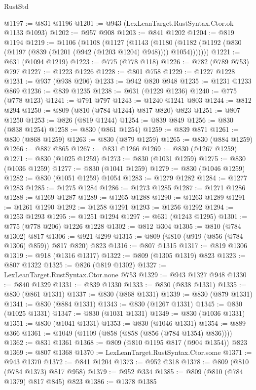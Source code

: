 \begin{lexlean}{RustStd}
\begin{coremodule}
@1197 := @831 @1196
@1201 := @943 (LexLeanTarget.RustSyntax.Ctor.ok @1133 @1093)
@1202 := @957 @908
@1203 := @841 @1202
@1204 := @819 @1194
@1219 := @1106
    (@1108
      (@1127
        (@1143
          (@1180 (@1182 (@1192 (@830 (@1197 (@839 (@1201 (@942 (@1203 @1204) @948)))) @1054)))))))
@1221 := @631 (@1094 @1219)
@1223 := @775 (@778 @118)
@1226 := @782 (@789 @753) @797
@1227 := @1223 @1226
@1228 := @801 @758
@1229 := @1227 @1228
@1231 := @937 (@938 @206)
@1233 := @942 @820 @948
@1235 := @1231 @1233 @869
@1236 := @839 @1235
@1238 := @631 (@1229 @1236)
@1240 := @775 (@778 @123)
@1241 := @791 @797
@1243 := @1240 @1241 @803
@1244 := @812 @294
@1250 := @809 (@810 (@784 @1244) @817 @820) @823
@1251 := @807 @1250
@1253 := @826 (@819 @1244)
@1254 := @839 @849
@1256 := @830 (@838 @1254)
@1258 := @830 (@861 @1254)
@1259 := @839 @871
@1261 := @830 (@868 @1259)
@1263 := @830 (@879 @1259)
@1265 := @830 (@884 @1259)
@1266 := @887 @865
@1267 := @831 @1266
@1269 := @830 (@1267 @1259)
@1271 := @830 (@1025 @1259)
@1273 := @830 (@1031 @1259)
@1275 := @830 (@1036 @1259)
@1277 := @830 (@1041 @1259)
@1279 := @830 (@1046 @1259)
@1282 := @830 (@1051 @1259) @1054
@1283 := @1279 @1282
@1284 := @1277 @1283
@1285 := @1275 @1284
@1286 := @1273 @1285
@1287 := @1271 @1286
@1288 := @1269 @1287
@1289 := @1265 @1288
@1290 := @1263 @1289
@1291 := @1261 @1290
@1292 := @1258 @1291
@1293 := @1256 @1292
@1294 := @1253 @1293
@1295 := @1251 @1294
@1297 := @631 (@1243 @1295)
@1301 := @775 (@778 @206) @1226 @1228
@1302 := @812 @304
@1305 := @810 (@784 @1302) @817
@1306 := @921 @299
@1315 := @809 (@810 (@919 (@856 (@784 @1306) @859)) @817 @820) @823
@1316 := @807 @1315
@1317 := @819 @1306
@1319 := @918 (@1316 @1317)
@1322 := @809 (@1305 @1319) @823
@1323 := @807 @1322
@1325 := @826 (@819 @1302)
@1327 := LexLeanTarget.RustSyntax.Ctor.none @753
@1329 := @943 @1327 @948
@1330 := @840 @1329
@1331 := @839 @1330
@1333 := @830 (@838 @1331)
@1335 := @830 (@861 @1331)
@1337 := @830 (@868 @1331)
@1339 := @830 (@879 @1331)
@1341 := @830 (@884 @1331)
@1343 := @830 (@1267 @1331)
@1345 := @830 (@1025 @1331)
@1347 := @830 (@1031 @1331)
@1349 := @830 (@1036 @1331)
@1351 := @830 (@1041 @1331)
@1353 := @830 (@1046 @1331)
@1354 := @889 @366
@1361 := @1049 (@1109 (@858 (@858 (@856 (@784 @1354) @836))))
@1362 := @831 @1361
@1368 := @809 (@810 @1195 @817 (@904 @1354)) @823
@1369 := @807 @1368
@1370 := LexLeanTarget.RustSyntax.Ctor.some
@1371 := @943 @1370
@1372 := @841 @1204
@1373 := @952 @318
@1378 := @809 (@810 (@784 @1373) @817 @958)
@1379 := @952 @334
@1385 := @809 (@810 (@784 @1379) @817 @845) @823
@1386 := @1378 @1385

\end{coremodule}
\end{lexlean}
